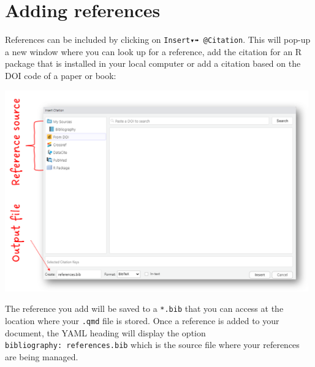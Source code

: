 \documentclass[
  letterpaper,
  DIV=11,
  numbers=noendperiod]{scrartcl}
\begin{document}
\section{Adding references}\label{adding-references}

References can be included by clicking on \texttt{Insert▾➠\ @Citation}.
This will pop-up a new window where you can look up for a reference, add
the citation for an R package that is installed in your local computer
or add a citation based on the DOI code of a paper or book:

\begin{center}
\includegraphics[width=5.15625in,height=\textheight]{images/referencing.png}
\end{center}

The reference you add will be saved to a \texttt{*.bib} that you can
access at the location where your \texttt{.qmd} file is stored. Once a
reference is added to your document, the YAML heading will display the
option \texttt{bibliography:\ references.bib} which is the source file
where your references are being managed.
\end{document}
